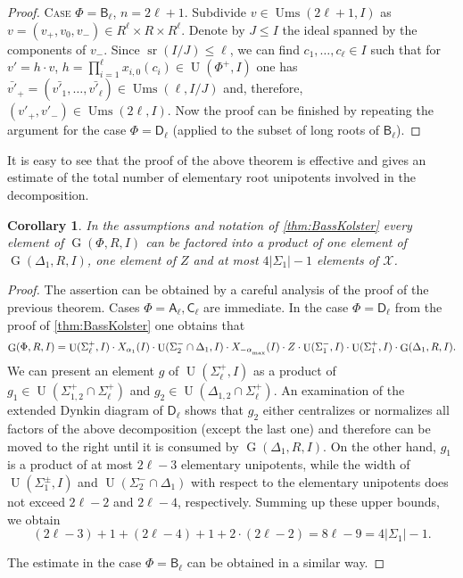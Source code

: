 \documentclass[oneside, 12pt]{amsart}
\theoremstyle{plain}
\numberwithin{equation}{section}
\numberwithin{lemma}{section}
\newtheorem{cor}[lemma]{Corollary}
\theoremstyle{definition}
\theoremstyle{remark}
\DeclareMathOperator{\G}{G}
\DeclareMathOperator{\U}{U}
\DeclareMathOperator{\sr}{sr}
\DeclareMathOperator{\Ums}{Ums}
\newcommand{\rA}{\mathsf{A}}
\newcommand{\rB}{\mathsf{B}}
\newcommand{\rC}{\mathsf{C}}
\newcommand{\rD}{\mathsf{D}}
\def\ssub#1{\mathchoice
   {_{\lower2pt\hbox{$\scriptstyle #1$}}}
   {_{\lower2pt\hbox{$\scriptstyle #1$}}}
   {_{\lower1.5pt\hbox{$\scriptscriptstyle #1$}}}
   {_{\!\lower1.5pt\hbox{$\scriptscriptstyle #1$}}}}
\begin{document}
\begin{proof}
\textsc{Case $\Phi=\rB_\ell$, $n=2\ell+1$.} Subdivide $v\in \Ums(2\ell+1, I)$ as $v=(v_+, v_0, v_-)\in R^\ell\times R\times R^\ell$.
Denote by $J\leqslant I$ the ideal spanned by the components of $v_-$.
Since $\sr(I/J)\leqslant \ell$, we can find $c_1, \dots, c_\ell\in I$ such that for $v' = h \cdot v$, $h = \prod_{i=1}^\ell x_{i, 0}(c_i) \in \U(\Phi^+, I)$
one has $\bar{v'}_+=(\bar{v'_1}, \ldots, \bar{v'_\ell}) \in \Ums(\ell, I/J)$ and, therefore, $(v'_+, v'_-) \in \Ums(2\ell, I)$.
Now the proof can be finished by repeating the argument for the case $\Phi=\rD_\ell$ (applied to the subset of long roots of $\rB_\ell$).
\end{proof}

It is easy to see that the proof of the above theorem is effective and gives an estimate of the total number of elementary root unipotents involved in the decomposition.
\begin{cor}\label{cor:bass-kolster-count}
In the assumptions and notation of \cref{thm:BassKolster} every element of $\G(\Phi, R, I)$ 
can be factored into a product of one element of $\G(\Delta_1, R, I)$, one element of $Z$ and at most $4|\Sigma_1|-1$ elements of $\mathcal{X}$.
\end{cor}
\begin{proof}
The assertion can be obtained by a careful analysis of the proof of the previous theorem.
Cases $\Phi=\rA_\ell, \rC_\ell$ are immediate.
In the case $\Phi=\rD_\ell$ from the proof of \cref{thm:BassKolster} one obtains that
\begin{equation*} \G(\Phi, R, I) =  \U(\Sigma_\ell^+, I) \cdot X_{\alpha_1}(I) \cdot \U(\Sigma_2^-\cap\Delta_1, I) \cdot X_{-\alpha\ssub{\mathrm{max}}}(I) \cdot Z \cdot \U(\Sigma_1^-, I) \cdot \U(\Sigma_1^+, I) \cdot \G(\Delta_1, R, I). \end{equation*}
We can present an element $g$ of $\U(\Sigma_\ell^+, I)$ as a product of $g_1 \in \U(\Sigma_{1, 2}^+ \cap \Sigma_\ell^+)$ and $g_2\in \U(\Delta_{1, 2}\cap \Sigma_\ell^+)$.
An examination of the extended Dynkin diagram of $\rD_\ell$ shows that $g_2$ either centralizes or normalizes all factors of the above decomposition (except the last one)
and therefore can be moved to the right until it is consumed by $\G(\Delta_1, R, I)$.
On the other hand, $g_1$ is a product of at most $2\ell-3$ elementary unipotents, while the width of $\U(\Sigma_1^\pm, I)$ and $\U(\Sigma_2^-\cap\Delta_1)$ with respect to the elementary unipotents does not exceed $2\ell-2$ and $2\ell-4$, respectively.
Summing up these upper bounds, we obtain
$$(2\ell-3) + 1 + (2\ell - 4) + 1 + 2\cdot (2\ell - 2) = 8\ell - 9 = 4|\Sigma_1| - 1.$$

The estimate in the case $\Phi=\rB_\ell$ can be obtained in a similar way. \end{proof}
\end{document}

